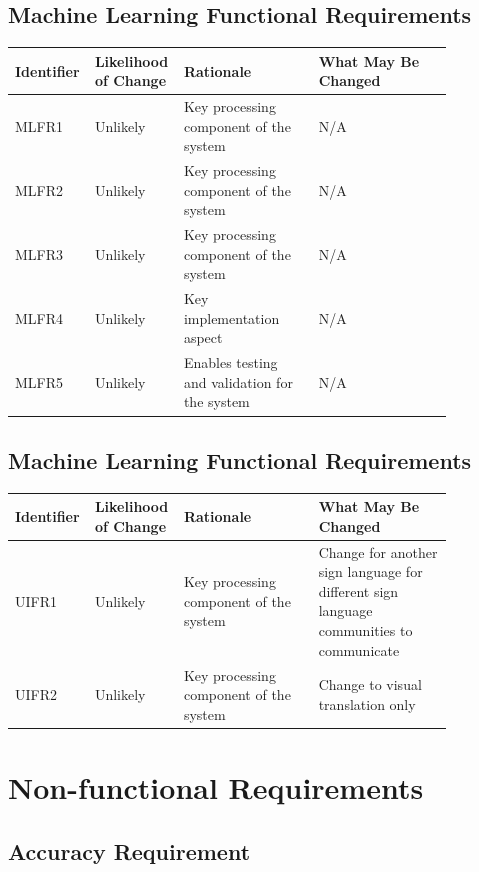 \documentclass[12pt]{article}
\begin{document}
\subsection{Machine Learning Functional Requirements}

\renewcommand{\arraystretch}{1.2}
\noindent \begin{tabularx}{\textwidth}{p{0.12\linewidth}|p{0.15\linewidth}|p{0.3\linewidth}|p{0.3\linewidth}}
\toprule
\textbf{Identifier} & \textbf{Likelihood of Change} & \textbf{Rationale} & \textbf{What May Be Changed}\\
\midrule
MLFR1 
& Unlikely
& Key processing component of the system
& N/A\\
\hline
MLFR2 
& Unlikely
& Key processing component of the system
& N/A\\
\hline
MLFR3 
& Unlikely
& Key processing component of the system
& N/A\\
\hline
MLFR4 
& Unlikely
& Key implementation aspect
& N/A\\
\hline
MLFR5 
& Unlikely
& Enables testing and validation for the system
& N/A\\
\bottomrule
\end{tabularx}

\subsection{Machine Learning Functional Requirements}

\renewcommand{\arraystretch}{1.2}
\noindent \begin{tabularx}{\textwidth}{p{0.12\linewidth}|p{0.15\linewidth}|p{0.3\linewidth}|p{0.3\linewidth}}
\toprule
\textbf{Identifier} & \textbf{Likelihood of Change} & \textbf{Rationale} & \textbf{What May Be Changed}\\
\midrule
UIFR1
& Unlikely
& Key processing component of the system
& Change for another sign language for different sign language communities to communicate\\
\hline
UIFR2
& Unlikely
& Key processing component of the system
& Change to visual translation only\\
\bottomrule
\end{tabularx}

\section{Non-functional Requirements}
\subsection{Accuracy Requirement}
\end{document}
